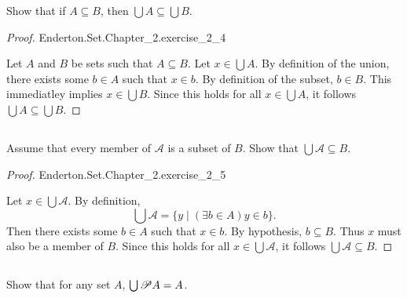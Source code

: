 \documentclass{report}
\begin{document}
Show that if $A \subseteq B$, then $\bigcup A \subseteq \bigcup B$.

\begin{proof}

    {Enderton.Set.Chapter\_2.exercise\_2\_4}

  Let $A$ and $B$ be sets such that $A \subseteq B$.
  Let $x \in \bigcup A$.
  By definition of the union, there exists some $b \in A$ such that $x \in b$.
  By definition of the subset, $b \in B$.
  This immediatley implies $x \in \bigcup B$.
  Since this holds for all $x \in \bigcup A$, it follows
    $\bigcup A \subseteq \bigcup B$.

\end{proof}

\subsection{}%

Assume that every member of $\mathscr{A}$ is a subset of $B$.
Show that $\bigcup \mathscr{A} \subseteq B$.

\begin{proof}

    {Enderton.Set.Chapter\_2.exercise\_2\_5}

  Let $x \in \bigcup \mathscr{A}$.
  By definition,
    $$\bigcup \mathscr{A} = \{ y \mid (\exists b \in A)y \in b \}.$$
  Then there exists some $b \in A$ such that $x \in b$.
  By hypothesis, $b \subseteq B$.
  Thus $x$ must also be a member of $B$.
  Since this holds for all $x \in \bigcup \mathscr{A}$, it follows
    $\bigcup \mathscr{A} \subseteq B$.

\end{proof}

\subsection{}%

Show that for any set $A$, $\bigcup \mathscr{P}A = A$.
\end{document}
